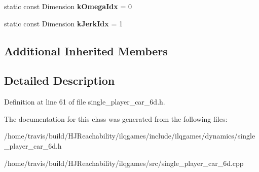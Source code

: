 \begin{DoxyCompactItemize}
\item 
static const Dimension {\bfseries k\+Omega\+Idx} = 0\hypertarget{classilqgames_1_1_single_player_car6_d_af76abcc4941bee9a03a2a48f02549682}{}\label{classilqgames_1_1_single_player_car6_d_af76abcc4941bee9a03a2a48f02549682}

\item 
static const Dimension {\bfseries k\+Jerk\+Idx} = 1\hypertarget{classilqgames_1_1_single_player_car6_d_a619427a67ea75bbba027a90f00a8cede}{}\label{classilqgames_1_1_single_player_car6_d_a619427a67ea75bbba027a90f00a8cede}

\end{DoxyCompactItemize}
\subsection*{Additional Inherited Members}


\subsection{Detailed Description}


Definition at line 61 of file single\+\_\+player\+\_\+car\+\_\+6d.\+h.



The documentation for this class was generated from the following files\+:\begin{DoxyCompactItemize}
\item 
/home/travis/build/\+H\+J\+Reachability/ilqgames/include/ilqgames/dynamics/single\+\_\+player\+\_\+car\+\_\+6d.\+h\item 
/home/travis/build/\+H\+J\+Reachability/ilqgames/src/single\+\_\+player\+\_\+car\+\_\+6d.\+cpp\end{DoxyCompactItemize}
